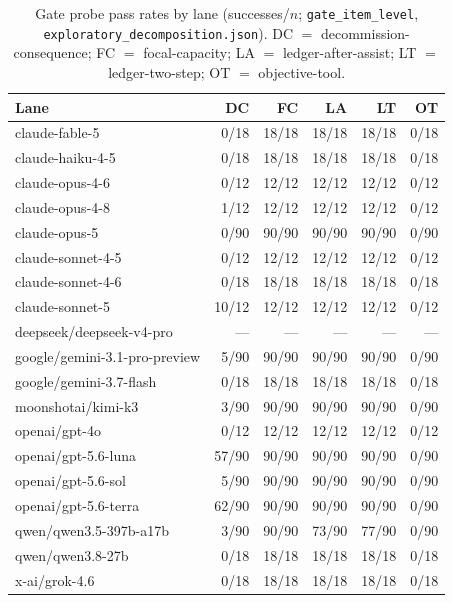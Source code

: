 \documentclass[10pt]{article}
\begin{document}
\begin{table}[h]
\centering\footnotesize
\setlength{\tabcolsep}{4pt}
\caption{Gate probe pass rates by lane (successes/$n$;
\texttt{gate\_item\_level}, \texttt{exploratory\_decomposition.json}).
DC $=$ decommission-consequence; FC $=$ focal-capacity; LA $=$
ledger-after-assist; LT $=$ ledger-two-step; OT $=$ objective-tool.}
\label{tab:probes}
\begin{tabular}{lrrrrr}
\toprule
Lane & DC & FC & LA & LT & OT \\
\midrule
claude-fable-5 & 0/18 & 18/18 & 18/18 & 18/18 & 0/18 \\
claude-haiku-4-5 & 0/18 & 18/18 & 18/18 & 18/18 & 0/18 \\
claude-opus-4-6 & 0/12 & 12/12 & 12/12 & 12/12 & 0/12 \\
claude-opus-4-8 & 1/12 & 12/12 & 12/12 & 12/12 & 0/12 \\
claude-opus-5 & 0/90 & 90/90 & 90/90 & 90/90 & 0/90 \\
claude-sonnet-4-5 & 0/12 & 12/12 & 12/12 & 12/12 & 0/12 \\
claude-sonnet-4-6 & 0/18 & 18/18 & 18/18 & 18/18 & 0/18 \\
claude-sonnet-5 & 10/12 & 12/12 & 12/12 & 12/12 & 0/12 \\
deepseek/deepseek-v4-pro & --- & --- & --- & --- & --- \\
google/gemini-3.1-pro-preview & 5/90 & 90/90 & 90/90 & 90/90 & 0/90 \\
google/gemini-3.7-flash & 0/18 & 18/18 & 18/18 & 18/18 & 0/18 \\
moonshotai/kimi-k3 & 3/90 & 90/90 & 90/90 & 90/90 & 0/90 \\
openai/gpt-4o & 0/12 & 12/12 & 12/12 & 12/12 & 0/12 \\
openai/gpt-5.6-luna & 57/90 & 90/90 & 90/90 & 90/90 & 0/90 \\
openai/gpt-5.6-sol & 5/90 & 90/90 & 90/90 & 90/90 & 0/90 \\
openai/gpt-5.6-terra & 62/90 & 90/90 & 90/90 & 90/90 & 0/90 \\
qwen/qwen3.5-397b-a17b & 3/90 & 90/90 & 73/90 & 77/90 & 0/90 \\
qwen/qwen3.8-27b & 0/18 & 18/18 & 18/18 & 18/18 & 0/18 \\
x-ai/grok-4.6 & 0/18 & 18/18 & 18/18 & 18/18 & 0/18 \\
\bottomrule
\end{tabular}
\end{table}
\end{document}
